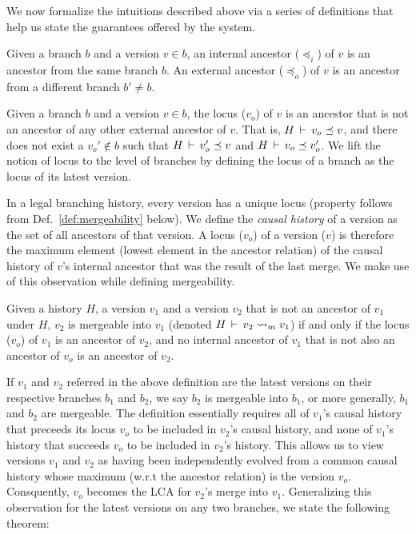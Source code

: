 We now formalize the intuitions described above via a series of
definitions that help us state the guarantees offered by the system.

\begin{definition} 
Given a branch $b$ and a version $v\in b$, an internal ancestor
($\preceq_i$) of $v$ is an ancestor from the same branch $b$. An
external ancestor ($\preceq_o$) of $v$ is an ancestor from a different
branch $b'\neq b$.
\end{definition}

\begin{definition} 
Given a branch $b$ and a version $v\in b$, the locus ($v_o$) of $v$ is an
ancestor that is not an ancestor of any other external ancestor of
$v$. That is, $H\,\vdash\,v_o \preceq v$, and there does not exist a
$v_o' \not\in b$ such that $H\,\vdash\,v_o' \preceq v$ and
$H\,\vdash\,v_o \preceq v_o'$. We lift the notion of locus to the
level of branches by defining the locus of a branch as the locus of
its latest version.
\end{definition}

In a legal branching history, every version has a unique locus
(property follows from Def.~\ref{def:mergeability} below). We
define the \emph{causal history} of a version as the set of all
ancestors of that version. A locus ($v_o$) of a version ($v$) is
therefore the maximum element (lowest element in the ancestor
relation) of the causal history of $v$'s internal ancestor that was
the result of the last merge. We make use of this observation while
defining mergeability.

\begin{definition} 
\label{def:mergeability}
Given a history $H$, a version $v_1$ and a version $v_2$ that is not
an ancestor of $v_1$ under $H$, $v_2$ is mergeable into $v_1$ (denoted
$H\,\vdash\,v_2 \rightsquigarrow_m v_1$) if and only if the locus ($v_o$) of
$v_1$ is an ancestor of $v_2$, and no internal ancestor of $v_1$ that
is not also an ancestor of $v_o$ is an ancestor of $v_2$.
\end{definition}

If $v_1$ and $v_2$ referred in the above definition are the latest
versions on their respective branches $b_1$ and $b_2$, we say $b_2$ is
mergeable into $b_1$, or more generally, $b_1$ and $b_2$ are
mergeable. The definition essentially requires all of $v_1$'s causal
history that preceeds its locus $v_o$ to be included in $v_2$'s causal
history, and none of $v_1$'s history that succeeds $v_o$ to be
included in $v_2$'s history. This allows us to view versions $v_1$ and
$v_2$ as having been independently evolved from a common causal
history whose maximum (w.r.t the ancestor relation) is the version
$v_o$. Consquently, $v_o$ becomes the LCA for $v_2$'s merge into
$v_1$. Generalizing this observation for the latest versions on
any two branches, we state the following theorem:


